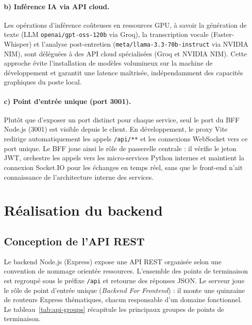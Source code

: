 \paragraph{b) Inférence IA via API cloud.}
Les opérations d'inférence coûteuses en ressources GPU, à savoir la génération de texte (LLM
\texttt{openai/gpt-oss-120b} via Groq), la transcription vocale (Faster-Whisper) et l'analyse
post-entretien (\texttt{meta/llama-3.3-70b-instruct} via NVIDIA NIM), sont déléguées à des
API cloud spécialisées (Groq et NVIDIA NIM). Cette approche évite l'installation de modèles
volumineux sur la machine de développement et garantit une latence maîtrisée, indépendamment
des capacités graphiques du poste local.

\paragraph{c) Point d'entrée unique (port 3001).}
Plutôt que d'exposer un port distinct pour chaque service, seul le port du BFF Node.js
(3001) est visible depuis le client. En développement, le proxy Vite redirige
automatiquement les appels \texttt{/api/**} et les connexions WebSocket vers ce port
unique. Le BFF joue ainsi le rôle de passerelle centrale : il vérifie le jeton JWT,
orchestre les appels vers les micro-services Python internes et maintient la connexion
Socket.IO pour les échanges en temps réel, sans que le front-end n'ait connaissance de
l'architecture interne des services.

\section{Réalisation du backend}

\subsection{Conception de l'API REST}

Le backend Node.js (Express) expose une API REST organisée selon une convention de nommage
orientée ressources. L'ensemble des points de terminaison est regroupé sous le préfixe
\texttt{/api} et retourne des réponses JSON. Le serveur joue le rôle de point d'entrée unique
(\textit{Backend For Frontend}) : il monte une quinzaine de routeurs Express thématiques,
chacun responsable d'un domaine fonctionnel. Le tableau~\ref{tab:api-groups} récapitule les
principaux groupes de points de terminaison.

